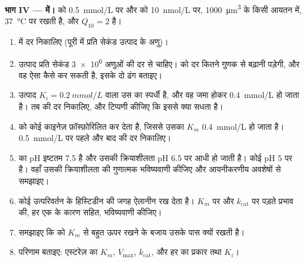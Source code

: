 \begin{problem}
\medskip
\noindent\textbf{भाग IV ---  में।}
  को \qty{0.5}{mmol/L} पर और  को
\qty{10}{nmol/L} पर, \qty{1000}{\micro m^3} के किसी आयतन में,
\qty{37}{\celsius} पर रखती है, और $Q_{10} = 2$ है।
\begin{enumerate}[resume]
  \item {} में दर निकालिए (पूरी  में प्रति सेकंड उत्पाद के
        अणु)।
  \item उत्पाद प्रति सेकंड \qty{3e6}{} अणुओं की दर से चाहिए।
         को दर कितने गुणक से बढ़ानी पड़ेगी, और वह ऐसा कैसे कर
        सकती है, इसके दो ढंग बताइए।
  \item उत्पाद $K_i = \qty{0.2}{mmol/L}$ वाला उस  का स्पर्धी
         है, और वह जमा होकर \qty{0.4}{mmol/L} हो जाता है। तब की दर
        निकालिए, और टिप्पणी कीजिए कि इससे क्या सधता है।
  \item {} को कोई काइनेज़ फ़ॉस्फ़ोरिलित कर देता है, जिससे उसका
        $K_m$ \qty{0.4}{mmol/L} हो जाता है। \qty{0.5}{mmol/L} 
        पर पहले और बाद की दर निकालिए।
  \item {} का pH इष्टतम 7.5 है और उसकी क्रियाशीलता pH
        6.5 पर आधी हो जाती है। कोई  pH 5 पर है। वहाँ उसकी
        क्रियाशीलता की गुणात्मक भविष्यवाणी कीजिए और आयनीकरणीय अवशेषों
        से समझाइए।
  \item कोई उत्परिवर्तन  के हिस्टिडीन की जगह ऐलानीन रख देता
        है। $K_m$ पर और $k_{\mathrm{cat}}$ पर पड़ते प्रभाव की, हर एक के
        कारण सहित, भविष्यवाणी कीजिए।
  \item समझाइए कि   को $K_m$ से बहुत ऊपर रखने के बजाय
        उसके पास क्यों रखती है।
  \item परिणाम बताइए: एस्टरेज़ का $K_m$, $V_{\max}$, $k_{\mathrm{cat}}$,
        और हर  का प्रकार तथा $K_i$।
\end{enumerate}
\end{problem}
